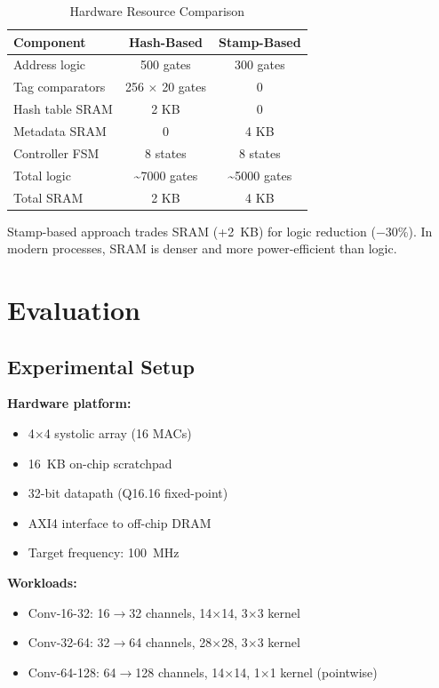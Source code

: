 \documentclass[conference]{IEEEtran}
\begin{document}
\begin{table}[t]
\centering
\caption{Hardware Resource Comparison}
\label{tab:resources}
\begin{tabular}{lcc}
\toprule
\textbf{Component} & \textbf{Hash-Based} & \textbf{Stamp-Based} \\
\midrule
Address logic & 500 gates & 300 gates \\
Tag comparators & 256 $\times$ 20 gates & 0 \\
Hash table SRAM & 2 KB & 0 \\
Metadata SRAM & 0 & 4 KB \\
Controller FSM & 8 states & 8 states \\
\midrule
Total logic & \textasciitilde7000 gates & \textasciitilde5000 gates \\
Total SRAM & 2 KB & 4 KB \\
\bottomrule
\end{tabular}
\end{table}

Stamp-based approach trades SRAM (+2~KB) for logic reduction ($-$30\%). In modern processes, SRAM is denser and more power-efficient than logic.

\section{Evaluation}

\subsection{Experimental Setup}

\textbf{Hardware platform:}
\begin{itemize}
\item 4$\times$4 systolic array (16 MACs)
\item 16~KB on-chip scratchpad
\item 32-bit datapath (Q16.16 fixed-point)
\item AXI4 interface to off-chip DRAM
\item Target frequency: 100~MHz
\end{itemize}

\textbf{Workloads:}
\begin{itemize}
\item Conv-16-32: 16$\to$32 channels, 14$\times$14, 3$\times$3 kernel
\item Conv-32-64: 32$\to$64 channels, 28$\times$28, 3$\times$3 kernel
\item Conv-64-128: 64$\to$128 channels, 14$\times$14, 1$\times$1 kernel (pointwise)
\end{itemize}
\end{document}
